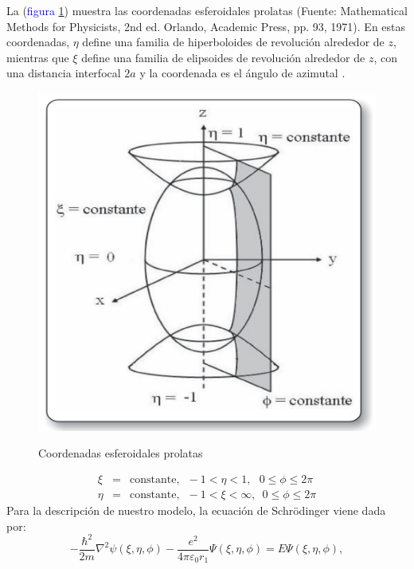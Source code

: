\documentclass[12pt]{article}
\begin{document}
        La (\textcolor{blue}{figura \ref{Figura 2}}) muestra las coordenadas 
        esferoidales prolatas (Fuente: Mathematical 
        Methods for Physicists, 2nd ed. Orlando, 
        Academic Press, pp. 93, 1971). En estas 
        coordenadas, $\eta$ define una familia de 
        hiperboloides de revolución alrededor de $z$, 
        mientras que $\xi$ define una familia de elipsoides 
        de revolución alrededor de $z$, con una distancia 
        interfocal $2a$ y la coordenada es el ángulo de 
        azimutal \textcolor{blue}{\cite{Arfken}}. 
        \begin{figure}[H] 
            \centering
            \caption{Coordenadas esferoidales prolatas}
            \includegraphics[scale=0.5]{Figuras/Figura2.PNG}
            \label{Figura 2}
        \end{figure}
        \begin{eqnarray}
            \xi &=& \text{constante}, \, \, \, -1 < \eta < 1, \, \, \, \, 0 \leq \phi \leq 2\pi \label{Equation 2}\\
            \eta &=& \text{constante}, \, \, \, -1 < \xi < \infty, \, \, \, 0 \leq \phi \leq 2\pi \label{Equation 3}
        \end{eqnarray}
        Para la descripción de nuestro modelo, la 
        ecuación de Schr\"odinger viene dada por:
        \begin{equation}\label{Equation 4}
            -\dfrac{\hbar^{2}}{2m} \nabla^{2} \psi \left(\xi,\eta,\phi\right)-\dfrac{e^{2}}{4\pi\varepsilon_{0}r_{1}}\Psi\left(\xi,\eta,\phi\right) = E\Psi \left(\xi,\eta,\phi\right),
        \end{equation}
\end{document}
